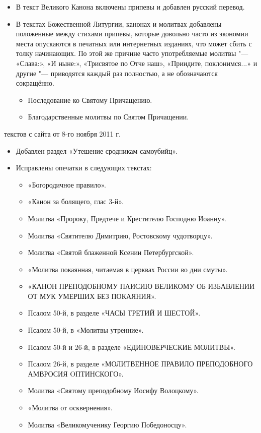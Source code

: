 {\begin{itemize}
\item В текст Великого Канона включены припевы и добавлен русский перевод.

\item В текстах Божественной Литургии, канонах и молитвах добавлены положенные между стихами припевы, которые довольно часто из экономии места опускаются в печатных или интернетных изданиях, что может сбить с толку начинающих. По этой же причине часто употребляемые молитвы "--- «Слава:», «И ныне:», «Трисвятое по Отче наш», «Приидите, поклонимся...» и другие "--- приводятся каждый раз полностью, а не обозначаются сокращённо.

\begin{itemize}
\item Последование ко Святому Причащению.
\item Благодарственные молитвы по Святом Причащении.
\end{itemize}

\end{itemize}}


{ текстов с сайта от 8-го ноября 2011 г.

\begin{itemize}

\item Добавлен раздел «Утешение сродникам самоубийц».
\item Исправлены опечатки в следующих текстах:

\begin{itemize}

\item «Богородичное правило».
\item «Канон за болящего, глас 3-й».
\item Молитва «Пророку, Предтече и Крестителю Господню Иоанну».
\item Молитва «Святителю Димитрию, Ростовскому чудотворцу».
\item Молитва «Святой блаженной Ксении Петербургской».
\item «Молитва покаянная, читаемая в церквах России во дни смуты».
\item «КАНОН ПРЕПОДОБНОМУ ПАИСИЮ ВЕЛИКОМУ ОБ ИЗБАВЛЕНИИ ОТ МУК УМЕРШИХ БЕЗ ПОКАЯНИЯ».
\item Псалом 50-й, в разделе «ЧАСЫ ТРЕТИЙ И ШЕСТОЙ».
\item Псалом 50-й, в «Молитвы утренние».
\item Псалом 50-й и 26-й, в разделе «ЕДИНОВЕРЧЕСКИЕ МОЛИТВЫ».
\item Псалом 26-й, в разделе «МОЛИТВЕННОЕ ПРАВИЛО ПРЕПОДОБНОГО АМВРОСИЯ OПТИНСКОГО».
\item Молитва «Святому преподобному Иосифу Волоцкому».
\item «Молитва от осквернения».
\item Молитва «Великомученику Георгию Победоносцу».
\end{itemize}

\end{itemize}}


